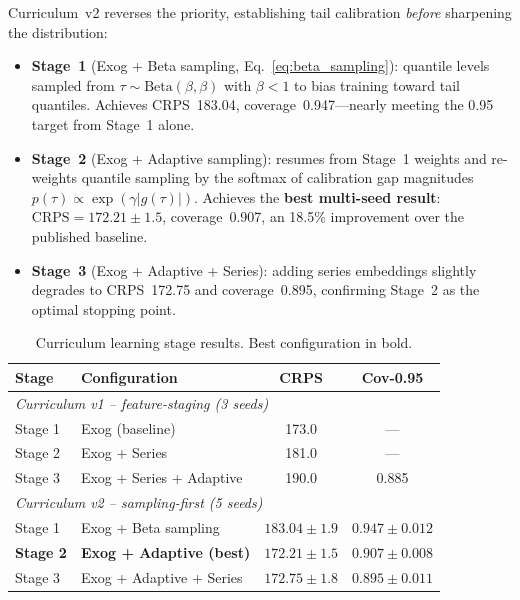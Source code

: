 Curriculum~v2 reverses the priority, establishing tail calibration
\emph{before} sharpening the distribution:
\begin{itemize}
  \item \textbf{Stage~1} (Exog + Beta sampling,
        Eq.~\ref{eq:beta_sampling}): quantile levels sampled from
        $\tau \sim \mathrm{Beta}(\beta,\beta)$ with $\beta<1$ to bias
        training toward tail quantiles.
        Achieves CRPS~183.04, coverage~0.947---nearly meeting the
        0.95 target from Stage~1 alone.
  \item \textbf{Stage~2} (Exog + Adaptive sampling):
        resumes from Stage~1 weights
        and re-weights quantile sampling by the softmax of calibration
        gap magnitudes $p(\tau) \propto \exp(\gamma|g(\tau)|)$.
        Achieves the \textbf{best multi-seed result}:
        $\mathrm{CRPS} = 172.21 \pm 1.5$, coverage~0.907,
        an 18.5\% improvement over the published baseline.
  \item \textbf{Stage~3} (Exog + Adaptive + Series): adding series
        embeddings slightly degrades to CRPS~172.75 and coverage~0.895,
        confirming Stage~2 as the optimal stopping point.
\end{itemize}

\begin{table}[H]
\centering
\caption{Curriculum learning stage results. Best configuration in bold.}
\label{tab:curriculum}
\begin{tabular}{llcc}
\toprule
\textbf{Stage} & \textbf{Configuration} & \textbf{CRPS} &
\textbf{Cov-0.95} \\
\midrule
\multicolumn{4}{l}{\textit{Curriculum v1 -- feature-staging (3 seeds)}} \\
Stage 1 & Exog (baseline)           & 173.0              & ---             \\
Stage 2 & Exog + Series             & 181.0              & ---             \\
Stage 3 & Exog + Series + Adaptive  & 190.0              & 0.885           \\
\midrule
\multicolumn{4}{l}{\textit{Curriculum v2 -- sampling-first (5 seeds)}} \\
Stage 1 & Exog + Beta sampling      & $183.04\pm1.9$     & $0.947\pm0.012$ \\
\textbf{Stage 2} & \textbf{Exog + Adaptive (best)} &
  $\mathbf{172.21\pm1.5}$ & $\mathbf{0.907\pm0.008}$ \\
Stage 3 & Exog + Adaptive + Series  & $172.75\pm1.8$     & $0.895\pm0.011$ \\
\bottomrule
\end{tabular}
\end{table}

